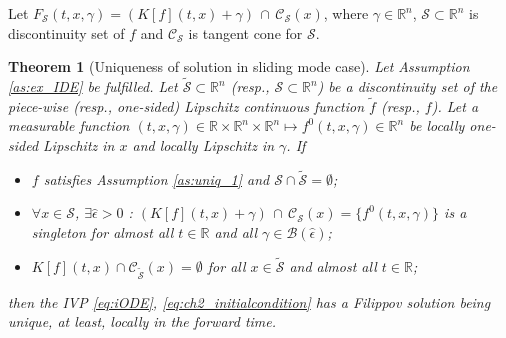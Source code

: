 \documentclass{article}
\newcommand{\R}{\mathbb{R}}
\newtheorem{theorem}{Theorem}
\begin{document}
Let $F_{\mathcal{S}}(t,x,\gamma)\!=\! \left(K[f](t,x)+\gamma\right)\,\cap\,\mathcal{C}_{\mathcal{S}}(x)$, where $\gamma\in \R^n$, $\mathcal{S}\!\subset\!\R^n$ is discontinuity set of $f$  and $\mathcal{C}_{\mathcal{S}}$ is tangent cone for $\mathcal{S}$.
\begin{theorem}[\small Uniqueness of solution in sliding mode case]\label{thm:unique_SM_iODE}\hfill \newline\itshape
	Let Assumption \ref{as:ex_IDE} be fulfilled. Let    $\tilde {\mathcal{S}}\subset \R^n$ (resp., $\mathcal{S}\subset \R^n$) be a discontinuity set of the piece-wise 	(resp., one-sided) Lipschitz continuous  function $\tilde f$ (resp., $f$). Let a measurable function $(t,x,\gamma)\in \R\times \R^n\times \R^n \mapsto f^0(t,x,\gamma)\in \R^n$ be
 locally one-sided Lipschitz in $x$ and locally Lipschitz in $\gamma$.
	If \vspace{-1mm}
	\begin{itemize} 
	\item[1)]	$f$  satisfies
 Assumption \ref{as:uniq_1} and 
$\mathcal{S}\cap \tilde {\mathcal{S}}=\emptyset$;
\item[2)]  $\forall x\in \mathcal{S}$, $\exists \hat \epsilon\!>\!0$ :  $\left(K[f](t,x)\!+\!\gamma\right)\,\cap\,\mathcal{C}_{\mathcal{S}}(x)\!=\!\{f^0(t,x,\gamma)\}$ is a singleton for almost all $t\in \R$ and 
all $\gamma\in \mathcal{B}(\hat \epsilon)$;
\item[3)]  $K[f](t,x)\cap \mathcal{C}_{\tilde{\mathcal{S}}}(x)\!=\!\emptyset$ for all $x\!\in\! \tilde{\mathcal{S}}$ and almost all $t\!\in\! \R$;\vspace{-1mm}
\end{itemize}
then	the IVP  \eqref{eq:iODE}, \eqref{eq:ch2_initialcondition} has a Filippov solution being unique,  at least, locally in the forward time. 	
\end{theorem}
\end{document}
